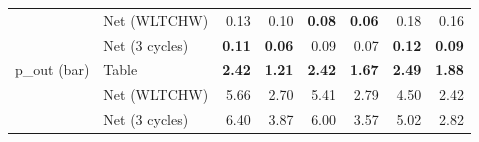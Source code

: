 \begin{table}[t]
\begin{tabular}{llrrrrrr}
 & Net (WLTCHW) & 0.13 & 0.10 & \textbf{0.08} & \textbf{0.06} & 0.18 & 0.16 \\
 & Net (3 cycles) & \textbf{0.11} & \textbf{0.06} & 0.09 & 0.07 & \textbf{0.12} & \textbf{0.09} \\
\addlinespace
p\_out (bar) & Table & \textbf{2.42} & \textbf{1.21} & \textbf{2.42} & \textbf{1.67} & \textbf{2.49} & \textbf{1.88} \\
 & Net (WLTCHW) & 5.66 & 2.70 & 5.41 & 2.79 & 4.50 & 2.42 \\
 & Net (3 cycles) & 6.40 & 3.87 & 6.00 & 3.57 & 5.02 & 2.82 \\
\bottomrule
\end{tabular}
\end{table}
